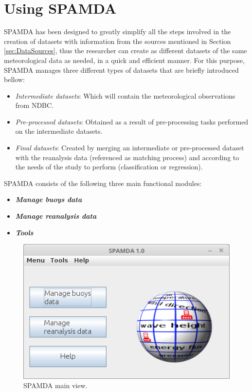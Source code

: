 
\chapter{Using SPAMDA}

	\begin{onehalfspace}
	
		SPAMDA has been designed to greatly simplify all the steps involved in the creation of datasets with information from the sources mentioned in Section \ref{sec:DataSources}, thus the researcher can create as different datasets of the same meteorological data as needed, in a quick and efficient manner. For this purpose, SPAMDA manages three different types of datasets that are briefly introduced bellow:
			\begin{itemize}
				\item \textit{Intermediate datasets}: Which will contain the meteorological observations from NDBC.
				\item \textit{Pre-processed datasets}: Obtained as a result of pre-processing tasks performed on the intermediate datasets.
				\item \textit{Final datasets}: Created by merging an intermediate or pre-processed dataset with the reanalysis data (referenced as matching process) and according to the needs of the study to perform (classification or regression).
			\end{itemize}
			
		SPAMDA consists of the following three main functional modules:
			\begin{itemize}
				\item \textbf{\textit{Manage buoys data}}
				\item \textbf{\textit{Manage reanalysis data}}
				\item \textbf{\textit{Tools}}
			\end{itemize}
			
		\begin{figure}[ht!]
			\centering
			\includegraphics[scale=0.5]{figures/mainView.png}
			\caption{SPAMDA main view.}
			\label{fig:mainView}
		\end{figure}
			

\end{onehalfspace}
